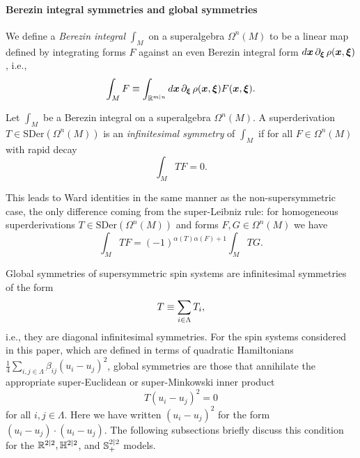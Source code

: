 \documentclass[11pt,a4paper]{article}
\begin{document}
\paragraph{Berezin integral symmetries and global symmetries}
We define a \emph{Berezin integral} $\int_{M}$ on a superalgebra
$\Omega^{n}(M)$ to be a linear map defined by integrating forms $F$
against an even Berezin integral form  $d\boldsymbol{x}\,\partial_{\boldsymbol{\xi}} \,
\rho(\boldsymbol{x},\boldsymbol{\xi})$, i.e., 
\begin{equation}
\int_M F \equiv \int_{\mathbb{R}^{m|n}} d\boldsymbol{x}\,\partial_{\boldsymbol{\xi}}\, \rho(\boldsymbol{x},\boldsymbol{\xi})F(\boldsymbol{x},\boldsymbol{\xi}). 
\end{equation}
\begin{definition}
  Let $\int_M$ be a Berezin integral 
  on a superalgebra $\Omega^{n}(M)$.  A superderivation
  $T\in \mathrm{SDer}(\Omega^{n}(M))$ is an \emph{infinitesimal
    symmetry} of $\int_{M}$ if for all
  $F \in \Omega^{n}(M)$ with rapid decay
  \begin{equation}
    \label{e:T-SUSY-symmetry}
    \int_M T F = 0.
  \end{equation}
\end{definition}

This leads to Ward identities in the same manner as the
non-supersymmetric case, the only difference coming from the
super-Leibniz rule: for homogeneous superderivations
$T\in \mathrm{SDer}{(\Omega^{n}(M))}$ and forms $F,G\in
\Omega^{n}(M)$
we have
\begin{equation}
\int_M TF = (-1)^{\alpha(T)\alpha(F)+1}\int_M TG.
\end{equation}

Global symmetries of supersymmetric spin systems are
infinitesimal symmetries of the form
\begin{equation}
T \equiv \sum_{i\in\Lambda} T_i,
\end{equation}
i.e., they are diagonal infinitesimal symmetries.
For the spin systems considered in this paper, which are defined in terms of
quadratic Hamiltonians
$\frac{1}{4}\sum_{i,j\in\Lambda}\beta_{ij}(u_{i}-u_{j})^{2}$, global symmetries
are those that
annihilate the appropriate super-Euclidean or super-Minkowski inner product
\begin{equation}
T(u_i-u_j)^2 = 0
\end{equation}
for all $i,j\in \Lambda$.
Here we have written
  $(u_{i}-u_{j})^{2}$ for the form $(u_{i}-u_{j})\cdot
  (u_{i}-u_{j})$. The following subsections briefly discuss this condition for
the $\mathbb{R}^{2|2}, \mathbb{H}^{2|2}$, and ${\mathbb S}^{2|2}_{+}$ models.
\end{document}
